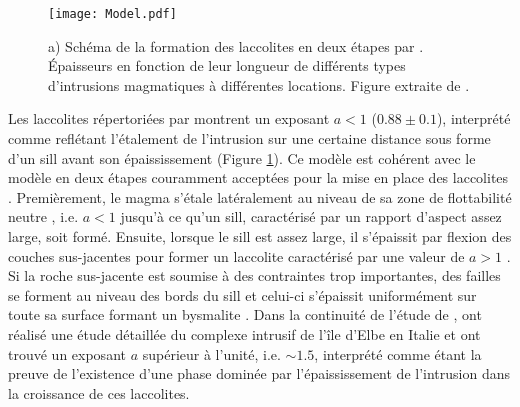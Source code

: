 \begin{figure}[htpb]
 \begin{center}
 \graphicspath{ {/Users/thorey/Documents/These/Manuscript/Figure/Chapter1/} }
 \texttt{[image: Model.pdf]}
 \caption{a) Schéma de la formation des laccolites en deux étapes
 par \citet{McCaffrey:1997ea}. Épaisseurs en fonction de leur
 longueur de différents types d'intrusions magmatiques à
 différentes locations. Figure extraite de \citet{Cruden:tg}.}
 \label{C1-Model}
 \end{center}
\end{figure}

Les laccolites répertoriées par \citet{E:2015tl} montrent un exposant
$a<1$ ($0.88 \pm 0.1$), interprété comme reflétant l'étalement de
l'intrusion sur une certaine distance sous forme d'un sill avant son
épaississement (Figure \ref{C1-Model}). Ce modèle est cohérent avec le
modèle en deux étapes couramment acceptées pour la mise en place des
laccolites \citep{Johnson:1973ho,McCaffrey:1997ea}. Premièrement, le
magma s'étale latéralement au niveau de sa zone de flottabilité neutre
, i.e. $a<1$ jusqu'à ce qu'un sill, caractérisé par un rapport
d'aspect assez large, soit formé. Ensuite, lorsque le sill est assez
large, il s'épaissit par flexion des couches sus-jacentes pour former
un laccolite caractérisé par une valeur de $a>1$
\citep{Johnson:1973ho,Koch:1981if}. Si la roche sus-jacente est
soumise à des contraintes trop importantes, des failles se forment au
niveau des bords du sill et celui-ci s'épaissit uniformément sur toute
sa surface formant un bysmalite \citep{E:2015tl}. Dans la continuité
de l'étude de \citet{McCaffrey:1997ea}, \citet{Rocchi:2002jy} ont
réalisé une étude détaillée du complexe intrusif de l'île d'Elbe en
Italie et ont trouvé un exposant $a$ supérieur à l'unité, i.e.
$\sim 1.5$, interprété comme étant la preuve de l'existence d'une
phase dominée par l'épaississement de l'intrusion dans la croissance
de ces laccolites.

